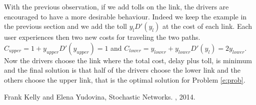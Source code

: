 With the previous observation, if we add tolls on the link, the drivers are encouraged to have a more desirable behaviour. Indeed we keep the example in the previous section and we add the toll $y_l D'(y_l)$ at the cost of each link. Each user experiences then two new costs for traveling the two paths. 
 $C_{upper}=1 + y_{upper} D'(y_{upper})= 1$ and   $C_{lower} = y_{lower} + y_{lower} D'(y_l)= 2y_{lower}$. Now the drivers choose the link where the total cost, delay plus toll, is minimum and the final solution is that half of the drivers choose the lower link and the others choose the upper link, that is the optimal solution for Problem \eqref{e:prob}.



\begin{thebibliography}{alpha}

 Frank Kelly and Elena Yudovina,
\newblock Stochastic Networks.
, 2014.

\end{thebibliography}




